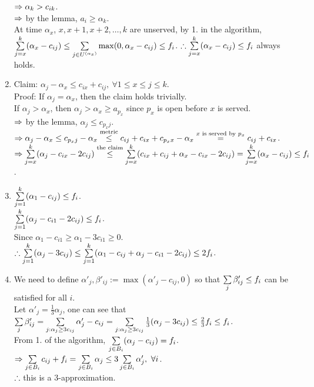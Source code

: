 \begin{pr}
\begin{enumerate}
$\Rightarrow\alpha_k>c_{ik}$.\\
$\Rightarrow$ by the lemma, $a_i\geq\alpha_k$.\\
At time $\alpha_x$, $x, x+1, x+2, \dots, k$ are unserved, by 1. in the algorithm, $\sum\limits_{j=x}^k(\alpha_x-c_{ij})\leq\sum\limits_{j\in U^{(\alpha_x)}}\max(0, \alpha_x-c_{ij})\leq f_i$.
$\therefore\sum\limits_{j=x}^k(\alpha_x-c_{ij})\leq f_i$ always holds.
\item Claim: $\alpha_j-\alpha_x\leq c_{ix}+c_{ij},\ \forall 1\leq x\leq j\leq k$.\\
Proof: If $\alpha_j=\alpha_x$, then the claim holds trivially.\\
If $\alpha_j>\alpha_x$, then $\alpha_j>\alpha_x\geq a_{p_x}$ since $p_x$ is open before $x$ is served.\\
$\Rightarrow$ by the lemma, $\alpha_j\leq c_{p_xj}$.\\
$\Rightarrow\alpha_j-\alpha_x\leq c_{p_xj}-\alpha_x\overset{\text{metric}}\leq c_{ij}+c_{ix}+c_{p_xx}-\alpha_x\overset{x\text{ is served by }p_x}=c_{ij}+c_{ix}$.\\
$\Rightarrow\sum\limits_{j=x}^k(\alpha_j-c_{ix}-2c_{ij})\overset{\text{the claim}}\leq\sum\limits_{j=x}^k(c_{ix}+c_{ij}+\alpha_x-c_{ix}-2c_{ij})=\sum\limits_{j=x}^k(\alpha_x-c_{ij})\leq f_i$.
\item $\sum\limits_{j=1}^k(\alpha_1-c_{ij})\leq f_i$.\\
$\sum\limits_{j=1}^k(\alpha_j-c_{i1}-2c_{ij})\leq f_i$.\\
Since $\alpha_1-c_{i1}\geq\alpha_1-3c_{i1}\geq0$.\\
$\therefore\sum\limits_{j=1}^k(\alpha_j-3c_{ij})\leq\sum\limits_{j=1}^k(\alpha_1-c_{ij}+\alpha_j-c_{i1}-2c_{ij})\leq2f_i$.
\item We need to define $\alpha'_j, \beta'_{ij}:=\max(\alpha'_j-c_{ij}, 0)$ so that $\sum\limits_j\beta'_{ij}\leq f_i$ can be satisfied for all $i$.\\
Let $\alpha'_j=\frac13\alpha_j$, one can see that $\sum\limits_j\beta'_{ij}=\sum\limits_{j:\alpha_j\geq3c_{ij}}\alpha'_j-c_{ij}=\sum\limits_{j:\alpha_j\geq3c_{ij}}\frac13(\alpha_j-3c_{ij})\leq\frac23f_i\leq f_i$.\\
From 1. of the algorithm, $\sum\limits_{j\in B_i}(\alpha_j-c_{ij})=f_i$.\\
$\Rightarrow\sum\limits_{j\in B_i}c_{ij}+f_i=\sum\limits_{j\in B_i}\alpha_j\leq3\sum\limits_{j\in B_i}\alpha'_j,\ \forall i$.\\
$\therefore$ this is a $3$-approximation.
\end{enumerate}
\end{pr}
